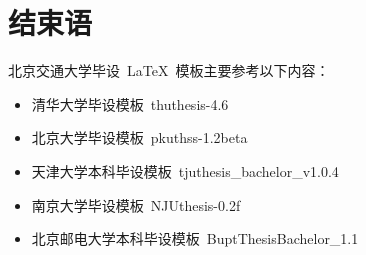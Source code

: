 \chapter{结束语}
北京交通大学毕设~\LaTeX{}~模板主要参考以下内容：
\begin{itemize}
  \item 清华大学毕设模板~thuthesis-4.6~
  \item 北京大学毕设模板~pkuthss-1.2beta~
  \item 天津大学本科毕设模板~tjuthesis\_bachelor\_v1.0.4~
  \item 南京大学毕设模板~NJUthesis-0.2f~
  \item 北京邮电大学本科毕设模板~BuptThesisBachelor\_1.1~
\end{itemize}
